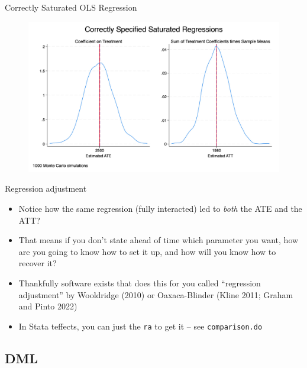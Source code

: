 \documentclass{beamer}
\begin{document}
\begin{frame}{Correctly Saturated OLS Regression}

\begin{figure}[!t]\centering
\includegraphics[scale=0.1]{./lecture_includes/combined_saturated2.jpg}
\end{figure}

\end{frame}

\begin{frame}{Regression adjustment}

\begin{itemize}

\item Notice how the same regression (fully interacted) led to \emph{both} the ATE and the ATT?
\item That means if you don't state ahead of time which parameter you want, how are you going to know how to set it up, and how will you know how to recover it?
\item Thankfully software exists that does this for you called ``regression adjustment'' by Wooldridge (2010) or Oaxaca-Blinder (Kline 2011; Graham and Pinto 2022) 
\item In Stata teffects, you can just the \texttt{ra} to get it -- see \texttt{comparison.do}

\end{itemize}

\end{frame}


\subsection{DML}
\end{document}
